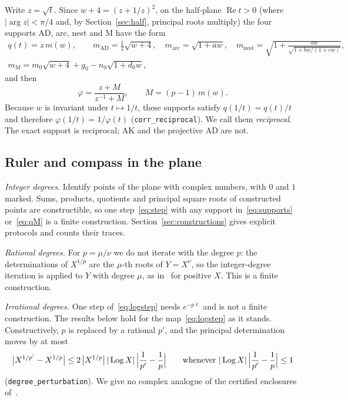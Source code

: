 \documentclass[10pt,a4paper]{article}
\theoremstyle{plain}
\theoremstyle{remark}
\numberwithin{equation}{section}
\DeclareMathOperator{\re}{Re}\DeclareMathOperator{\im}{Im}
\newcommand{\lean}[1]{\texttt{#1}}
\begin{document}
Write $z=\sqrt t$. Since $w+4=(z+1/z)^{2}$, on the half-plane $\re t>0$ (where $|\arg z|<\pi/4$
and, by Section~\ref{sec:half}, principal roots multiply) the four supports AD, arc, nest and
$\mathrm M$ have the form
\begin{equation}\label{eq:recip}
\begin{gathered}
 q(t)=z\,m(w),\qquad m_{\mathrm{AD}}=\tfrac12\sqrt{w+4},\quad m_{\mathrm{arc}}=\sqrt{1+a w},\quad
 m_{\mathrm{nest}}=\sqrt{1+\frac{a w}{\sqrt{1+b w/(1+c w)}}},\\
 m_{\mathrm M}=m_0\sqrt{w+4}+g_0-n_0\sqrt{1+d_0w},
\end{gathered}
\end{equation}
and then
\begin{equation}\label{eq:mobius}
  \varphi=\frac{z+M}{z^{-1}+M},\qquad M=(p-1)\,m(w).
\end{equation}
Because $w$ is invariant under $t\mapsto1/t$, these supports satisfy $q(1/t)=q(t)/t$ and therefore
$\varphi(1/t)=1/\varphi(t)$ (\lean{corr\_reciprocal}). We call them \emph{reciprocal}. The exact
support is reciprocal; AK and the projective AD are not.

\subsection{Ruler and compass in the plane}

\emph{Integer degrees.} Identify points of the plane with complex numbers, with $0$ and $1$ marked.
Sums, products, quotients and principal square roots of constructed points are constructible, so
one step~\eqref{eq:step} with any support in~\eqref{eq:supports} or~\eqref{eq:qM} is a finite
construction.
Section~\ref{sec:constructions} gives explicit protocols and counts their traces.

\emph{Rational degrees.} For $p=\mu/\nu$ we do not iterate with the degree $p$: the determinations
of $X^{1/p}$ are the $\mu$-th roots of $Y=X^{\nu}$, so the integer-degree iteration is applied to
$Y$ with degree $\mu$, as in~\cite[Proposition~4.5]{v28} for positive $X$. This is a finite
construction.

\emph{Irrational degrees.} One step of~\eqref{eq:logstep} needs $e^{-p\ell}$ and is not a finite
construction. The results below hold for the map~\eqref{eq:logstep} as it stands. Constructively,
$p$ is replaced by a rational $p'$, and the principal determination moves by at most
\begin{equation}\label{eq:perturb}
  \bigl|X^{1/p'}-X^{1/p}\bigr|\le2\,\bigl|X^{1/p}\bigr|\,|\operatorname{Log} X|\,\Bigl|\frac1{p'}-\frac1p\Bigr|
  \qquad\text{whenever }|\operatorname{Log} X|\,\Bigl|\frac1{p'}-\frac1p\Bigr|\le1
\end{equation}
(\lean{degree\_perturbation}). We give no complex analogue of the certified enclosures
of~\cite[Section~6]{v28}.
\end{document}
